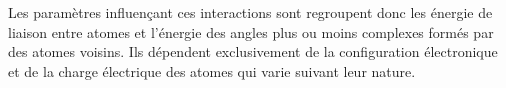 Les paramètres influençant ces interactions sont regroupent donc les énergie de liaison entre atomes et l'énergie des angles plus ou moins complexes formés par des atomes voisins. Ils dépendent exclusivement de la configuration électronique et de la charge électrique des atomes qui varie suivant leur nature.





